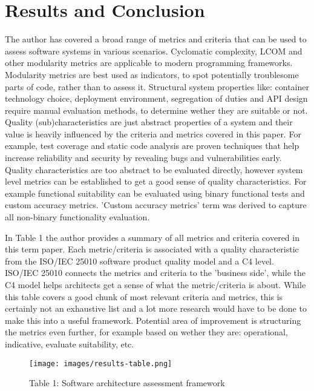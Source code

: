 \documentclass[12pt]{article}
\begin{document}
\section*{Results and Conclusion} %
The author has covered a broad range of metrics and criteria that can be used to assess software systems in various scenarios. Cyclomatic complexity, LCOM and other modularity metrics are applicable to modern programming frameworks. Modularity metrics are best used as indicators, to spot potentially troublesome parts of code, rather than to assess it. Structural system properties like: container technology choice, deployment environment, segregation of duties and API design require manual evaluation methods, to determine wether they are suitable or not. Quality (sub)characteristics are just abstract properties of a system and their value is heavily influenced by the criteria and metrics covered in this paper. For example, test coverage and static code analysis are proven techniques that help increase reliability and security by revealing bugs and vulnerabilities early. Quality characteristics are too abstract to be evaluated directly, however system level metrics can be established to get a good sense of quality characteristics. For example functional suitability can be evaluated using binary functional tests and custom accuracy metrics. 'Custom accuracy metrics' term was derived to capture all non-binary functionality evaluation. \par
In Table 1 the author provides a summary of all metrics and criteria covered in this term paper. Each metric/criteria is associated with a quality characteristic from the ISO/IEC 25010 software product quality model and a C4 level. ISO/IEC 25010 connects the metrics and criteria to the 'business side', while the C4 model helps architects get a sense of what the metric/criteria is about. While this table covers a good chunk of most relevant criteria and metrics, this is certainly not an exhaustive list and a lot more research would have to be done to make this into a useful framework. Potential area of improvement is structuring the metrics even further, for example based on wether they are: operational, indicative, evaluate suitability, etc.

\begin{figure}[H]
    \centering
    \captionsetup{labelformat=empty}
    \caption{Table 1: Software architecture assessment framework}
    \texttt{[image: images/results-table.png]}
    \label{tab:results-table}
\end{figure}
\newpage %
\end{document}

